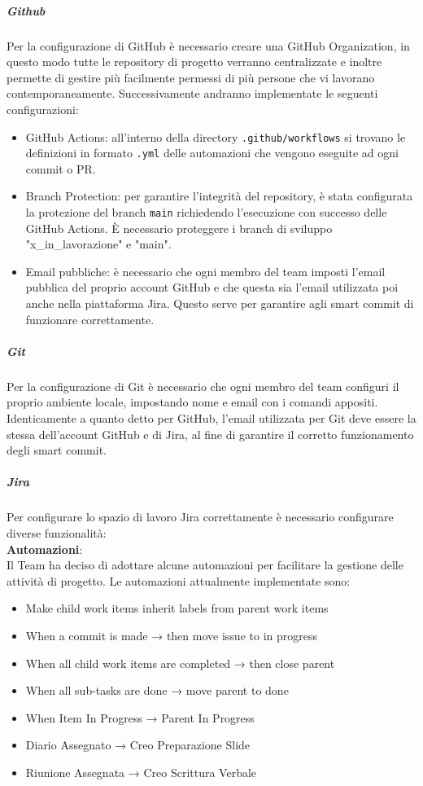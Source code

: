 \documentclass[a4paper,12pt]{article}
\begin{document}
\subparagraph{Github}
Per la configurazione di GitHub è necessario creare una GitHub Organization, in questo modo tutte le repository di progetto
verranno centralizzate e inoltre permette di gestire più facilmente permessi di più persone che vi lavorano contemporaneamente.
Successivamente andranno implementate le seguenti configurazioni:
\begin{itemize}
    \item GitHub Actions: all'interno della directory \texttt{.github/workflows} si trovano le definizioni in formato \texttt{.yml} delle automazioni che vengono eseguite ad ogni commit o PR.
    \item Branch Protection: per garantire l'integrità del repository, è stata configurata la protezione del branch \texttt{main} richiedendo l'esecuzione con successo delle GitHub Actions. \`E necessario proteggere i branch di sviluppo "x\_in\_lavorazione" e "main".
    \item Email pubbliche: è necessario che ogni membro del team imposti l'email pubblica del proprio account GitHub e che questa sia l'email utilizzata poi anche nella piattaforma Jira. Questo serve per garantire agli smart commit di funzionare correttamente.
\end{itemize}

\subparagraph{Git}
Per la configurazione di Git è necessario che ogni membro del team configuri il proprio ambiente locale, impostando nome e email con i comandi appositi.
Identicamente a quanto detto per GitHub, l'email utilizzata per Git deve essere la stessa dell'account GitHub e di Jira, al fine di garantire il corretto funzionamento degli smart commit.

\subparagraph{Jira} \label{conf_jira}
Per configurare lo spazio di lavoro Jira correttamente è necessario configurare diverse funzionalità: \\

\textbf{Automazioni}:\label{JiraAutomation}\\
Il Team ha deciso di adottare alcune automazioni per facilitare la gestione
delle attività di progetto. Le automazioni attualmente implementate sono:
\begin{itemize}
    \item Make child work items inherit labels from parent work items
    \item When a commit is made → then move issue to in progress
    \item When all child work items are completed → then close parent
    \item When all sub-tasks are done → move parent to done
    \item When Item In Progress → Parent In Progress
    \item Diario Assegnato → Creo Preparazione Slide
    \item Riunione Assegnata → Creo Scrittura Verbale
\end{itemize}
\end{document}
